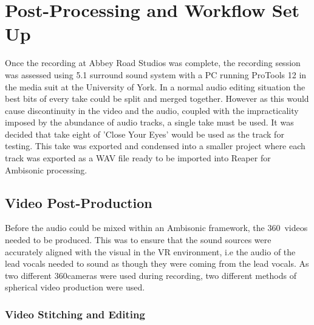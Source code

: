 
















\section{Post-Processing and Workflow Set Up} %

	Once the recording at Abbey Road Studios was complete, the recording session was assessed using 5.1 surround sound system with a PC running ProTools 12 in the media suit at the University of York. In a normal audio editing situation the best bits of every take could be split and merged together. However as this would cause discontinuity in the video and the audio, coupled with the impracticality imposed by the abundance of audio tracks, a single take must be used. It was decided that take eight of 'Close Your Eyes' would be used as the track for testing. This take was exported and condensed into a smaller project where each track was exported as a WAV file ready to be imported into Reaper for Ambisonic processing.


	\subsection{Video Post-Production}
		Before the audio could be mixed within an Ambisonic framework, the 360\textdegree~videos needed to be produced. This was to ensure that the sound sources were accurately aligned with the visual in the VR environment, i.e the audio of the lead vocals needed to sound as though they were coming from the lead vocals. As two different 360\textdegree cameras were used during recording, two different methods of spherical video production were used.

			\subsubsection{Video Stitching and Editing}

